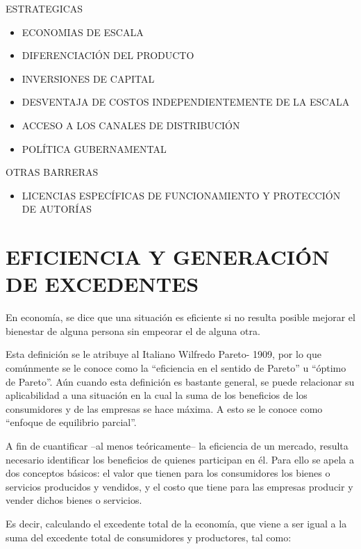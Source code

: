 \documentclass[
  letterpaper,
  DIV=11,
  numbers=noendperiod]{scrartcl}
\providecommand{\tightlist}{%
  \setlength{\itemsep}{0pt}\setlength{\parskip}{0pt}}\usepackage{longtable,booktabs,array}
\begin{document}
ESTRATEGICAS

\begin{itemize}
\item
  ECONOMIAS DE ESCALA
\item
  DIFERENCIACIÓN DEL PRODUCTO
\item
  INVERSIONES DE CAPITAL
\item
  DESVENTAJA DE COSTOS INDEPENDIENTEMENTE DE LA ESCALA
\item
  ACCESO A LOS CANALES DE DISTRIBUCIÓN
\item
  POLÍTICA GUBERNAMENTAL
\end{itemize}

OTRAS BARRERAS

\begin{itemize}
\tightlist
\item
  LICENCIAS ESPECÍFICAS DE FUNCIONAMIENTO Y PROTECCIÓN DE AUTORÍAS
\end{itemize}

\hypertarget{eficiencia-y-generaciuxf3n-de-excedentes}{%
\section{EFICIENCIA Y GENERACIÓN DE
EXCEDENTES}\label{eficiencia-y-generaciuxf3n-de-excedentes}}

En economía, se dice que una situación es eficiente si no resulta
posible mejorar el bienestar de alguna persona sin empeorar el de alguna
otra.

Esta definición se le atribuye al Italiano Wilfredo Pareto- 1909, por lo
que comúnmente se le conoce como la ``eficiencia en el sentido de
Pareto'' u ``óptimo de Pareto''. Aún cuando esta definición es bastante
general, se puede relacionar su aplicabilidad a una situación en la cual
la suma de los beneficios de los consumidores y de las empresas se hace
máxima. A esto se le conoce como ``enfoque de equilibrio parcial''.

A fin de cuantificar --al menos teóricamente-- la eficiencia de un
mercado, resulta necesario identificar los beneficios de quienes
participan en él. Para ello se apela a dos conceptos básicos: el valor
que tienen para los consumidores los bienes o servicios producidos y
vendidos, y el costo que tiene para las empresas producir y vender
dichos bienes o servicios.

Es decir, calculando el excedente total de la economía, que viene a ser
igual a la suma del excedente total de consumidores y productores, tal
como:
\end{document}
